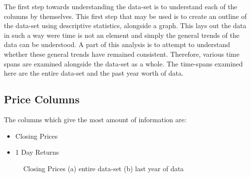 The first step towards understanding the data-set is to understand each of the columns by themselves. This first step that may be used is to create an outline of the data-set using descriptive statistics, alongside a graph. This lays out the data in such a way were time is not an element and simply the general trends of the data can be understood. A part of this analysis is to attempt to understand whether these general trends have remained consistent. Therefore, various time spans are examined alongside the data-set as a whole. The time-spans examined here are the entire data-set and the past year worth of data.

\subsection{Price Columns}

The columns which give the most amount of information are:
\begin{itemize}
    \item Closing Prices
    \item 1 Day Returns
\end{itemize}

\begin{figure}[h!]
    \centering
    \caption{Closing Prices (a) entire data-set (b) last year of data}
    \label{fig:closeDesc}
\end{figure}

